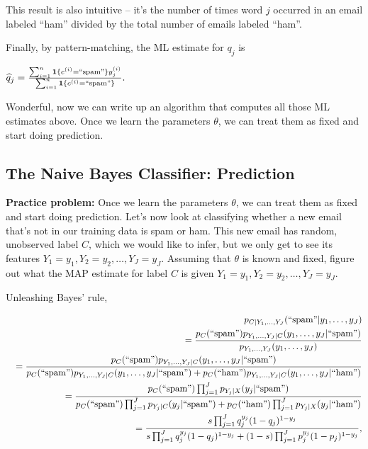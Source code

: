 This result is also intuitive -- it's the number of times word $j$ occurred in an email labeled ``ham'' divided by the total number of emails labeled ``ham''.

Finally, by pattern-matching, the ML estimate for $q_j$ is

{\centering$\widehat{q}_{j}=\frac{\sum _{i=1}^{n}\mathbf{1}\{ c^{(i)}=``\text {spam}"\} y_{j}^{(i)}}{\sum _{i=1}^{n}\mathbf{1}\{ c^{(i)}=``\text {spam}"\} }.$ \par}
 
Wonderful, now we can write up an algorithm that computes all those ML estimates above. Once we learn the parameters $\theta$, we can treat them as fixed and start doing prediction.


\subsection{The Naive Bayes Classifier: Prediction}

\textbf{Practice problem:} Once we learn the parameters $\theta$, we can treat them as fixed and start doing prediction. Let's now look at classifying whether a new email that's not in our training data is spam or ham. This new email has random, unobserved label $C$, which we would like to infer, but we only get to see its features $Y_{1} = y_1,Y_{2} = y_2,\dots ,Y_{J} = y_ J$. Assuming that $\theta$ is known and fixed, figure out what the MAP estimate for label $C$ is given $Y_{1} = y_1,Y_{2} = y_2,\dots ,Y_{J} = y_ J$.

Unleashing Bayes' rule,

\begin{eqnarray*}
 &&p_{C|Y_{1},\dots,Y_{J}}(``\text{spam}"|y_{1},\dots,y_{J})\\
 &&=\frac{p_{C}(``\text{spam}")p_{Y_{1},\dots,Y_{J}|C}(y_{1},\dots,y_{J}|``\text{spam}")}{p_{Y_{1},\dots,Y_{J}}(y_{1},\dots,y_{J})}\\
 &&=\frac{p_{C}(``\text{spam}")p_{Y_{1},\dots,Y_{J}|C}(y_{1},\dots,y_{J}|``\text{spam}")}{p_{C}(``\text{spam}")p_{Y_{1},\dots,Y_{J}|C}(y_{1},\dots,y_{J}|``\text{spam}")+p_{C}(``\text{ham}")p_{Y_{1},\dots,Y_{J}|C}(y_{1},\dots,y_{J}|``\text{ham}")} \\
 &&=\frac{p_{C}(``\text{spam}")\prod_{j=1}^{J}p_{Y_{j}|X}(y_{j}|``\text{spam}")}{p_{C}(``\text{spam}")\prod_{j=1}^{J}p_{Y_{j}|C}(y_{j}|``\text{spam}")+p_{C}(``\text{ham}")\prod_{j=1}^{J}p_{Y_{j}|X}(y_{j}|``\text{ham}")}\\
 &&=\frac{s\prod_{j=1}^{J}q_{j}^{y_{j}}(1-q_{j})^{1-y_{j}}}{s\prod_{j=1}^{J}q_{j}^{y_{j}}(1-q_{j})^{1-y_{j}}+(1-s)\prod_{j=1}^{J}p_{j}^{y_{j}}(1-p_{j})^{1-y_{j}}},
\end{eqnarray*}


